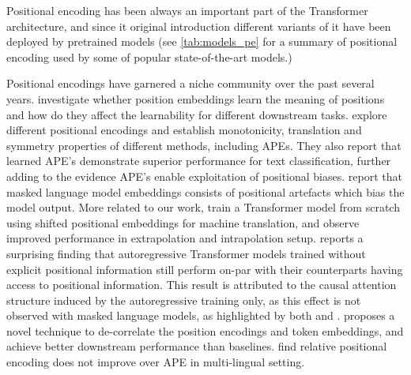 \documentclass[letterpaper, 12pt]{report}
\begin{document}
Positional encoding has been always an important part of the Transformer architecture, and since it original introduction different variants of it have been deployed by pretrained models (see \autoref{tab:models_pe} for a summary of positional encoding used by some of popular state-of-the-art models.)

Positional encodings have garnered a niche community over the past several years.
\citet{wang-chen-2020-position} investigate whether position embeddings learn the meaning of positions and how do they affect the learnability for different downstream tasks.
\citet{wang2021on} explore different positional encodings and establish monotonicity, translation and symmetry properties of different methods, including APEs.
They also report that learned APE's demonstrate superior performance for text classification, further adding to the evidence APE's enable exploitation of positional biases.
\citet{luo-etal-2021-positional} report that masked language model embeddings consists of positional artefacts which bias the model output.
More related to our work, \citet{kiyono2021} train a Transformer model from scratch using shifted positional embeddings for machine translation, and observe improved performance in extrapolation and intrapolation setup.
\citet{haviv2022} reports a surprising finding that autoregressive Transformer models trained without explicit positional information still perform on-par with their counterparts having access to positional information. This result is attributed to the causal attention structure induced by the autoregressive training only, as this effect is not observed with masked language models, as highlighted by both \citet{haviv2022} and \citet{sinha-etal-2021-masked}.
\citet{ke2021} proposes a novel technique to de-correlate the position encodings and token embeddings, and achieve better downstream performance than baselines.
\citet{ravishankar-etal-2021-multilingual} find relative positional encoding does not improve over APE in multi-lingual setting.
\end{document}
